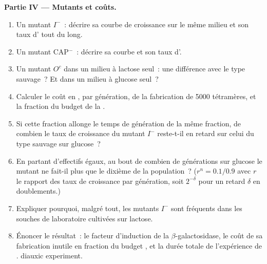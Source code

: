 \begin{problem}
\medskip
\noindent\textbf{Partie IV --- Mutants et coûts.}
\begin{enumerate}[resume]
  \item Un mutant $I^-$~: décrire sa courbe de croissance sur le même
        milieu et son taux d' tout du long.
  \item Un mutant CAP$^-$~: décrire sa courbe et son taux d'.
  \item Un mutant $O^c$ dans un milieu à lactose seul~: une différence
        avec le type sauvage~? Et dans un milieu à glucose seul~?
  \item Calculer le coût en , par génération, de la fabrication de
        \num{5000} tétramères, et la fraction du budget de la .
  \item Si cette fraction allonge le temps de génération de la même
        fraction, de combien le taux de croissance du mutant $I^-$
        reste-t-il en retard sur celui du type sauvage sur glucose~?
  \item En partant d'effectifs égaux, au bout de combien de générations
        sur glucose le mutant ne fait-il plus que le dixième de la
        population~? ($r^n =
        0.1/0.9$ avec $r$ le rapport des taux de croissance par
        génération, soit $2^{-\delta}$ pour un retard $\delta$ en
        doublements.)
  \item Expliquer pourquoi, malgré tout, les mutants $I^-$ sont
        fréquents dans les souches de laboratoire cultivées sur lactose.
  \item Énoncer le résultat~: le facteur d'induction de la
        $\beta$-galactosidase, le coût de sa fabrication inutile en
        fraction du budget , et la durée totale de l'expérience de
        .
        diauxic experiment.
\end{enumerate}
\end{problem}
